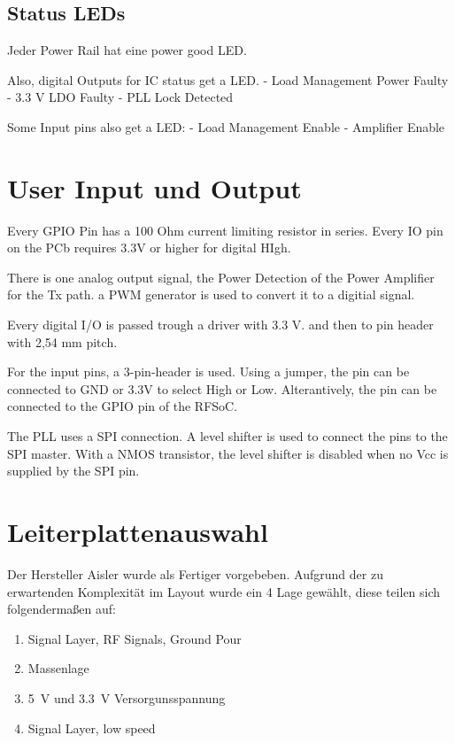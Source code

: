 \subsection{Status LEDs}

Jeder Power Rail hat eine power good LED. 

Also, digital Outputs for IC status get a LED.
- Load Management Power Faulty
- 3.3 V LDO Faulty
- PLL Lock Detected

Some Input pins also get a LED:
- Load Management Enable
- Amplifier Enable

\section{User Input und Output}

Every GPIO Pin has a 100 Ohm current limiting resistor in series. Every IO pin on the PCb requires 3.3V or higher for digital HIgh.

There is one analog output signal, the Power Detection of the Power Amplifier for the Tx path. a PWM generator is used to convert it to a digitial signal.

Every digital I/O is passed trough a driver with 3.3 V. and then to pin header with 2,54 mm pitch.

For the input pins, a 3-pin-header is used. Using a jumper, the pin can be connected to GND or 3.3V to select High or Low. Alterantively, the pin can be connected to the GPIO pin of the RFSoC. 

The PLL uses a SPI connection. A level shifter is used to connect the pins to the SPI master. With a NMOS transistor, the level shifter is disabled when no Vcc is supplied by the SPI pin.

\section{Leiterplattenauswahl}

Der Hersteller Aisler wurde als Fertiger vorgebeben. Aufgrund der zu erwartenden Komplexität im Layout wurde ein 4 Lage gewählt, diese teilen sich folgendermaßen auf:

\begin{enumerate}
    \item Signal Layer, RF Signals, Ground Pour
    \item Massenlage
    \item \qty{5}{\volt} und \qty{3.3}{\volt} Versorgunsspannung
    \item Signal Layer, low speed
\end{enumerate}

